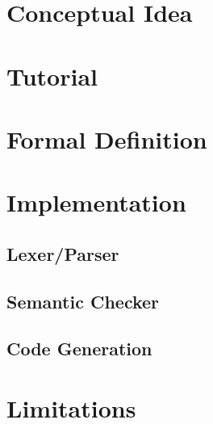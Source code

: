 \section{Conceptual Idea}



\section{Tutorial}

\section{Formal Definition}

\section{Implementation}

\subsection{Lexer/Parser}

\subsection{Semantic Checker}

\subsection{Code Generation}

\section{Limitations}
